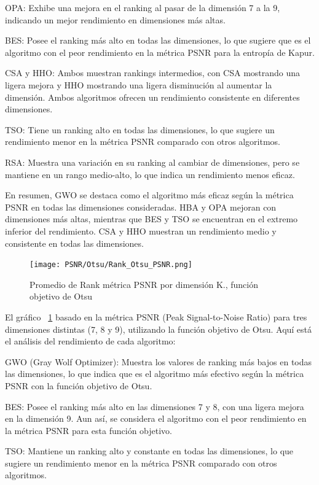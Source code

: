 \documentclass[conference]{IEEEtran}
\begin{document}
\noindent OPA: Exhibe una mejora en el ranking al pasar de la dimensión 7 a la 9, indicando un mejor rendimiento en dimensiones más altas.

\noindent BES: Posee el ranking más alto en todas las dimensiones, lo que sugiere que es el algoritmo con el peor rendimiento en la métrica PSNR para la entropía de Kapur.

\noindent CSA y HHO: Ambos muestran rankings intermedios, con CSA mostrando una ligera mejora y HHO mostrando una ligera disminución al aumentar la dimensión. Ambos algoritmos ofrecen un rendimiento consistente en diferentes dimensiones.

\noindent TSO: Tiene un ranking alto en todas las dimensiones, lo que sugiere un rendimiento menor en la métrica PSNR comparado con otros algoritmos.

\noindent RSA: Muestra una variación en su ranking al cambiar de dimensiones, pero se mantiene en un rango medio-alto, lo que indica un rendimiento menos eficaz.

\noindent En resumen, GWO se destaca como el algoritmo más eficaz según la métrica PSNR en todas las dimensiones consideradas. HBA y OPA mejoran con dimensiones más altas, mientras que BES y TSO se encuentran en el extremo inferior del rendimiento. CSA y HHO muestran un rendimiento medio y consistente en todas las dimensiones.


\begin{figure}[htbp]
	\centering
	\texttt{[image: PSNR/Otsu/Rank\_Otsu\_PSNR.png]}
	\caption{Promedio de Rank métrica PSNR por dimensión K., función objetivo de Otsu}
	\label{fig:PSNR_Otsu_Rank}
\end{figure}
\noindent El gráfico  ~\ref{fig:PSNR_Otsu_Rank} basado en la métrica PSNR (Peak Signal-to-Noise Ratio) para tres dimensiones distintas (7, 8 y 9), utilizando la función objetivo de Otsu. Aquí está el análisis del rendimiento de cada algoritmo:

\noindent GWO (Gray Wolf Optimizer): Muestra los valores de ranking más bajos en todas las dimensiones, lo que indica que es el algoritmo más efectivo según la métrica PSNR con la función objetivo de Otsu.

\noindent BES: Posee el ranking más alto en las dimensiones 7 y 8, con una ligera mejora en la dimensión 9. Aun así, se considera el algoritmo con el peor rendimiento en la métrica PSNR para esta función objetivo.

\noindent TSO: Mantiene un ranking alto y constante en todas las dimensiones, lo que sugiere un rendimiento menor en la métrica PSNR comparado con otros algoritmos.
\end{document}
